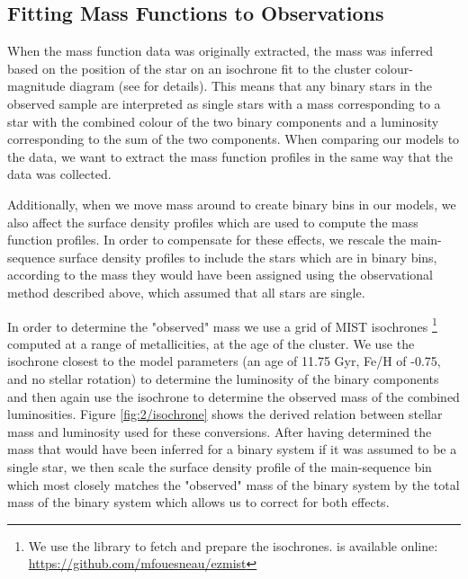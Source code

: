 \subsection{Fitting Mass Functions to Observations}

When the mass function data was originally extracted, the mass was inferred based on the position of
the star on an isochrone fit to the cluster colour-magnitude diagram (see \citealt{Sollima2017} for
details). This means that any binary stars in the observed sample are interpreted as single stars
with a mass corresponding to a star with the combined colour of the two binary components and a
luminosity corresponding to the sum of the two components. When comparing our models to the data, we
want to extract the mass function profiles in the same way that the data was collected.

Additionally, when we move mass around to create binary bins in our models, we also affect the
surface density profiles which are used to compute the mass function profiles. In order to
compensate for these effects, we rescale the main-sequence surface density profiles to include the
stars which are in binary bins, according to the mass they would have been assigned using the
observational method described above, which assumed that all stars are single.

In order to determine the "observed" mass we use a grid of MIST isochrones
\citep{Dotter2016,Choi2016}\footnote{We use the  library to fetch and prepare the
isochrones.  is available online: \url{https://github.com/mfouesneau/ezmist}} computed
at a range of metallicities, at the age of the cluster. We use the isochrone closest to the model
parameters (an age of 11.75 Gyr, Fe/H of -0.75, and no stellar rotation) to determine the luminosity
of the binary components and then again use the isochrone to determine the observed mass of the
combined luminosities. Figure \ref{fig:2/isochrone} shows the derived relation between stellar mass
and luminosity used for these conversions. After having determined the mass that would have been
inferred for a binary system if it was assumed to be a single star, we then scale the surface
density profile of the main-sequence bin which most closely matches the "observed" mass of the
binary system by the total mass of the binary system which allows us to correct for both effects.


